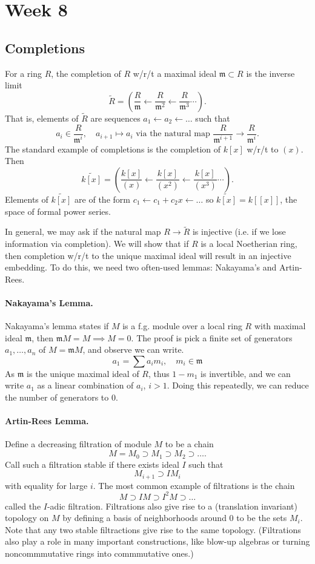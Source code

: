 \section{Week 8}

\subsection{Completions}
For a ring $R$, the completion of $R$ w/r/t a maximal ideal $\mathfrak m \subset R$ is the inverse limit
\[
    \tilde{R} = \left( \frac{R}{\mathfrak m} \leftarrow \frac{R}{\mathfrak m^2} \leftarrow \frac{R}{\mathfrak m^3} \cdots \right).
\]
That is, elements of $\tilde{R}$ are sequences $a_1 \leftarrow a_2 \leftarrow \dots$ such that
\[
    a_i \in \frac{R}{\mathfrak m^i}, \quad a_{i+1} \mapsto a_i \text{ via the natural map } \frac{R}{\mathfrak m^{i+1}} \to \frac{R}{\mathfrak m^i}.
\]
The standard example of completions is the completion of $k[x]$ w/r/t to $(x)$. Then
\[
    \tilde{k[x]} = \left( \frac{k[x]}{(x)} \leftarrow \frac{k[x]}{(x^2)} \leftarrow \frac{k[x]}{(x^3)} \cdots \right).
\]
Elements of $\tilde{k[x]}$ are of the form $c_1 \leftarrow c_1 + c_2x \leftarrow \dots$ so $\tilde{k[x]} = k[[x]]$, the space of formal power series.

In general, we may ask if the natural map $R \to \tilde{R}$ is injective (i.e. if we lose information via completion). We will show that if $R$ is a local Noetherian ring, then completion w/r/t to the unique maximal ideal will result in an injective embedding. To do this, we need two often-used lemmas: Nakayama's and Artin-Rees.

\paragraph{Nakayama's Lemma.} Nakayama's lemma states if $M$ is a f.g. module over a local ring $R$ with maximal ideal $\mathfrak m$, then $\mathfrak m M = M \implies M = 0$. The proof is pick a finite set of generators $a_1, \dots, a_n$ of $M = \mathfrak m M$, and observe we can write.
\[
    a_1 = \sum a_i m_i, \quad m_i \in \mathfrak m
\]
As $\mathfrak m$ is the unique maximal ideal of $R$, thus $1 - m_1$ is invertible, and we can write $a_1$ as a linear combination of $a_i$, $i > 1$. Doing this repeatedly, we can reduce the number of generators to 0.

\paragraph{Artin-Rees Lemma.} Define a decreasing filtration of module $M$ to be a chain
\[
    M = M_0 \supset M_1 \supset M_2 \supset \dots.
\]
Call such a filtration stable if there exists ideal $I$ such that
\[
    M_{i+1} \supset IM_{i}
\]
with equality for large $i$. The most common example of filtrations is the chain
\[
    M \supset IM \supset I^2M \supset \dots
\]
called the $I$-adic filtration. Filtrations also give rise to a (translation invariant) topology on $M$ by defining a basis of neighborhoods around 0 to be the sets $M_i$. Note that any two stable filtractions give rise to the same topology. (Filtrations also play a role in many important constructions, like blow-up algebras or turning noncommmutative rings into commmutative ones.)

